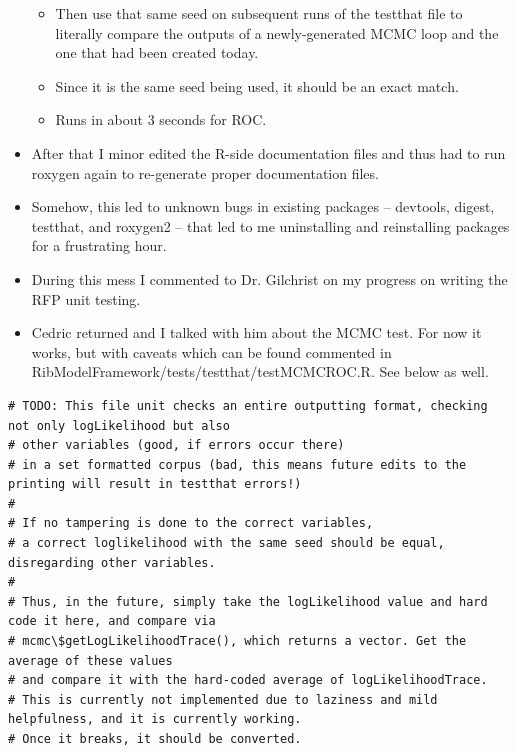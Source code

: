 \documentclass[12pt,hyperref]{labbook}
\newcommand{\sep}{\discretionary{}{}{}} %
\begin{document}
\begin{itemize}
\begin{itemize}
        \item Then use that same seed on subsequent runs of the testthat file to literally compare
the outputs of a newly-generated MCMC loop and the one that had been created today.
        \item Since it is the same seed being used, it should be an exact match.
        \item Runs in about 3 seconds for ROC.
    \end{itemize}
    \item After that I minor edited the R-side documentation files and thus had to run roxygen
again to re-generate proper documentation files.
    \item Somehow, this led to unknown bugs in existing packages -- devtools, digest, testthat, and roxygen2 -- that led to me uninstalling and reinstalling packages for a frustrating hour.
    \item During this mess I commented to Dr. Gilchrist on my progress on writing the RFP unit testing.
    \item Cedric returned and I talked with him about the MCMC test. For now it works, but with caveats which can be found commented in Rib\sep Model\sep Framework\sep/\sep tests\sep /\sep testthat\sep /\sep test\sep MCMC\sep ROC\sep .\sep R. See below as well.
\end{itemize}

\noindent\begin{minipage}{\linewidth}
\begin{lstlisting}
# TODO: This file unit checks an entire outputting format, checking not only logLikelihood but also
# other variables (good, if errors occur there) 
# in a set formatted corpus (bad, this means future edits to the printing will result in testthat errors!)
#
# If no tampering is done to the correct variables,
# a correct loglikelihood with the same seed should be equal, disregarding other variables.
#
# Thus, in the future, simply take the logLikelihood value and hard code it here, and compare via
# mcmc\$getLogLikelihoodTrace(), which returns a vector. Get the average of these values
# and compare it with the hard-coded average of logLikelihoodTrace.
# This is currently not implemented due to laziness and mild helpfulness, and it is currently working.
# Once it breaks, it should be converted.
\end{lstlisting}
\end{minipage}

\end{document}
